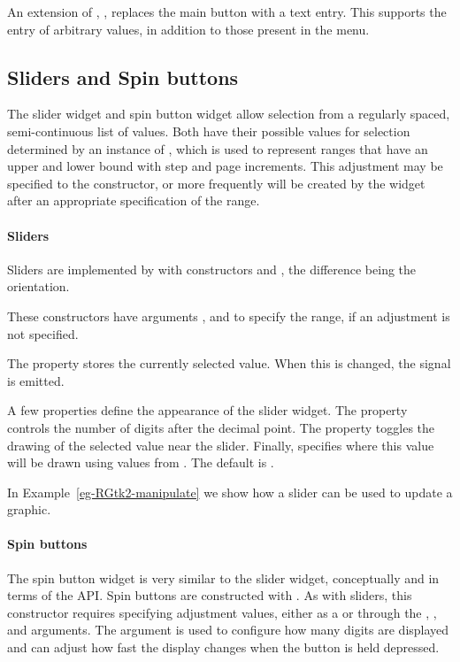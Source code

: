 An extension of , ,
replaces the main button with a text entry. This supports the entry of
arbitrary values, in addition to those present in the menu.



\subsection{Sliders and Spin buttons}
\label{sec:RGtk2:sliders-spinbuttons}

The slider widget and spin button widget allow selection from a
regularly spaced, semi-continuous list of values. Both have their
possible values for selection determined by an instance of
, which is used to represent ranges that have an
upper and lower bound with step and page increments. This adjustment
may be specified to the constructor, or more frequently will be
created by the widget after an appropriate specification of the range.

\paragraph{Sliders}
Sliders are implemented by  with constructors
 and , the difference
being the orientation. 

These constructors have arguments ,
 and  to specify
the range, if an adjustment is not specified. 

The  property stores the currently selected value. When
this is changed, the  signal is emitted. 

A few properties define the appearance of the slider widget.  The
 property controls the number of digits after the decimal
point.  The property  toggles the drawing of the
selected value near the slider. Finally, 
specifies where this value will be drawn using
values from . The default is .

In Example~\ref{eg-RGtk2-manipulate} we show how a slider can be used
to update a graphic.

\paragraph{Spin buttons}
The spin button widget is very similar to the slider widget,
conceptually and in terms of the \GTK\/ API. Spin buttons are
constructed with . As with sliders, this
constructor requires specifying adjustment values, either as a
 or through the ,
, and  arguments.
The argument  is used to configure how many
digits are displayed and  can
adjust how fast the display changes when the button is held depressed.

